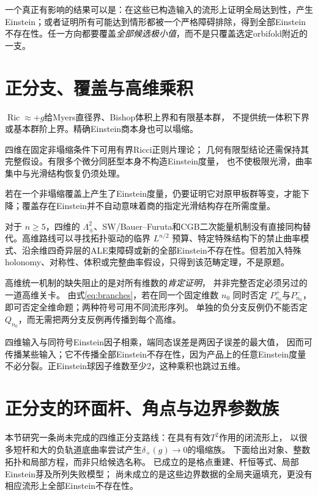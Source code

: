 \documentclass[UTF8,a4paper,11pt,fontset=fandol]{ctexart}
\numberwithin{equation}{section}
\theoremstyle{definition}
\newcommand{\Ric}{\operatorname{Ric}}
\begin{document}
一个真正有影响的结果可以是：在这些已构造输入的流形上证明全局达到性，产生Einstein；或者证明所有可能达到情形都被一个严格障碍排除，得到全部Einstein不存在性。任一方向都要覆盖\emph{全部候选极小值}，而不是只覆盖选定orbifold附近的一支。

\section{正分支、覆盖与高维乘积}
$\Ric\approx+g$给Myers直径界、Bishop体积上界和有限基本群，
不提供统一体积下界或基本群阶上界。精确Einstein商本身也可以塌缩。

四维在固定非塌缩条件下可用有界Ricci正则片理论\cite{CN}；
几何有限型结论还需保持其完整假设。有限多个微分同胚型本身不构造Einstein度量，
也不使极限光滑，曲率集中与光滑结构恢复仍须处理。

若在一个非塌缩覆盖上产生了Einstein度量，仍要证明它对原甲板群等变，才能下降；覆盖存在Einstein并不自动意味着商的指定光滑结构存在所需度量。

对于 $n\ge5$，四维的 $\Lambda^2_\pm$、SW/Bauer--Furuta和CGB二次能量机制没有直接同构替代。高维路线可以寻找拓扑驱动的临界 $L^{n/2}$ 预算、特定特殊结构下的禁止曲率模式、沿余维四奇异层的ALE束障碍或新的全部Einstein不存在性。但若加入特殊holonomy、对称性、体积或完整曲率假设，只得到该范畴定理，不是原题。

高维统一机制的缺失阻止的是对所有维数的\emph{肯定证明}，
并非完整否定必须另过的一道高维关卡。
由式\eqref{eq:branches}，若在同一个固定维数 $n_0$ 同时否定
$P_{n_0}^+$与$P_{n_0}^-$，即可否定全维命题；两种符号可用不同流形序列。
单独的负分支反例仍不能否定 $Q_{n_0}$，而无需把两分支反例再传播到每个高维。

四维输入与同符号Einstein因子相乘，端同态误差是两因子误差的最大值，
因而可传播某些输入；它不传播全部Einstein不存在性，因为产品上的任意Einstein度量
不必分裂。正Einstein球因子维数至少2，这种乘积也跳过五维。

\section{正分支的环面杆、角点与边界参数族}\label{sec:toric-rods}
本节研究一条尚未完成的四维正分支路线：在具有有效$T^2$作用的闭流形上，
以很多短杆和大的负轨道底曲率尝试产生$\delta_+(g)\to0$的塌缩族。
下面给出对象、整数拓扑和局部方程，而非只给候选名称。
已成立的是格点重建、杆恒等式、局部Einstein芽及所列失败模型；
尚未成立的是这些边界数据的全局夹逼填充，更没有相应流形上全部Einstein不存在性。
\end{document}
